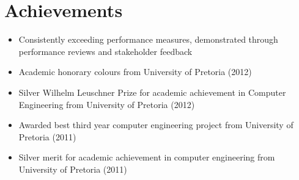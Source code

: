 \documentclass[11pt,a4paper]{article}
\begin{document}
\section*{Achievements}
\begin{itemize}
	\item Consistently exceeding performance measures, demonstrated through performance reviews and stakeholder feedback 
	\item Academic honorary colours from University of Pretoria (2012)
	\item Silver Wilhelm Leuschner Prize for academic achievement in Computer Engineering from University of Pretoria (2012) 
	\item Awarded best third year computer engineering project from University of Pretoria (2011) 
	\item Silver merit for academic achievement in computer engineering from University of Pretoria (2011) 
\end{itemize} 
\end{document}
